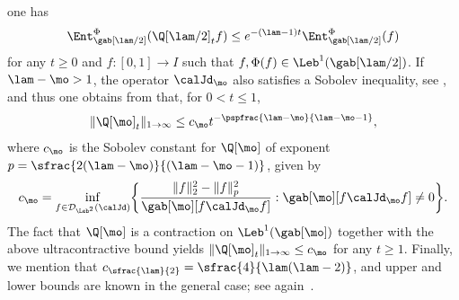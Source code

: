 \begin{appendix}
one has
\begin{equation}
\label{eq:C-D-entropy}
\Ent_{\gab[\lam/2]}^\Phi(\Q[\lam/2]_t f) \leq e^{-(\lam-1)t} \Ent_{\gab[\lam/2]}^\Phi(f)
\end{equation}
for any $t \geq 0$ and $f:[0,1] \to I$ such that $f, \Phi(f) \in \Leb^1(\gab[\lam/2])$. If $\lam-\mo > 1$, the operator $\calJd_\mo$ also satisfies a Sobolev inequality, see \eg \cite{Bakry-Jacobi}, and thus one obtains from \cite[Th.\,6.3.1]{Bakry_Book} that, for $0 < t \leq 1$,
\begin{equation*}
\|\Q[\mo]_t\|_{1\to\infty} \leq c_{\mo} t^{-\pspfrac{\lam-\mo}{\lam-\mo-1}},
\end{equation*}
where $c_{\mo}$ is the Sobolev constant for $\Q[\mo]$ of exponent $p = \sfrac{2(\lam-\mo)}{(\lam-\mo-1)}$, given by
\begin{equation*}
c_{\mo} = \inf_{f \in \mathcal{D}_{\Leb^2}(\calJd)} \biggl\lbrace \frac{\|f\|_2^2-\|f\|_p^2}{\gab[\mo][f \calJd_\mo f]} : \gab[\mo][f \calJd_\mo f] \neq 0 \biggr\rbrace.
\end{equation*}
The fact that $\Q[\mo]$ is a contraction on $\Leb^1(\gab[\mo])$ together with the above ultracontractive bound yields $\|\Q[\mo]_t\|_{1\to\infty} \leq c_{\mo}$ for any $t \geq 1$. Finally, we mention that $c_{\sfrac{\lam}{2}}=\sfrac{4}{\lam(\lam- 2)}$, and upper and lower bounds are known in the general case; see again~\cite{Bakry-Jacobi}.
\end{appendix}

